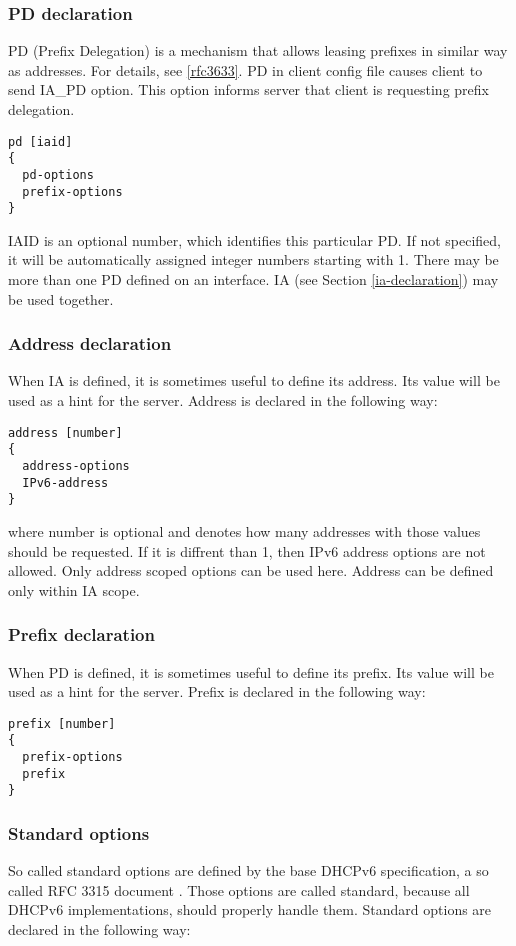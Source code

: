 \subsubsection{PD declaration}
\label{pd-declaration}
PD (Prefix Delegation) is a mechanism that allows leasing prefixes in
similar way as addresses. For details, see \ref{rfc3633}. PD in
client config file causes client to send IA\_PD option. This option
informs server that client is requesting prefix delegation.

\begin{verbatim}
pd [iaid]
{
  pd-options
  prefix-options
}
\end{verbatim}
IAID is an optional number, which identifies this particular PD. If
not specified, it will be automatically assigned integer numbers
starting with 1. There may be more than one PD defined on an
interface. IA (see Section \ref{ia-declaration}) may be used together.

\subsubsection{Address declaration}
When IA is defined, it is sometimes useful to define its address. Its
value will be used as a hint for the server. Address is declared in the
following way:

\begin{verbatim}
address [number]
{
  address-options
  IPv6-address
}
\end{verbatim}
where number is optional and denotes how many addresses with those values should be
requested. If it is diffrent than 1, then IPv6 address options are not
allowed. Only address scoped options can be used here. Address can be
defined only within IA scope.

\subsubsection{Prefix declaration}
When PD is defined, it is sometimes useful to define its prefix. Its
value will be used as a hint for the server. Prefix is declared in the
following way:

\begin{verbatim}
prefix [number]
{
  prefix-options
  prefix
}
\end{verbatim}

\subsubsection{Standard options}
So called standard options are defined by the base DHCPv6
specification, a so called RFC 3315 document \cite{rfc3315}. Those options are
called standard, because all DHCPv6 implementations, should properly
handle them. Standard options are declared in the following way:

